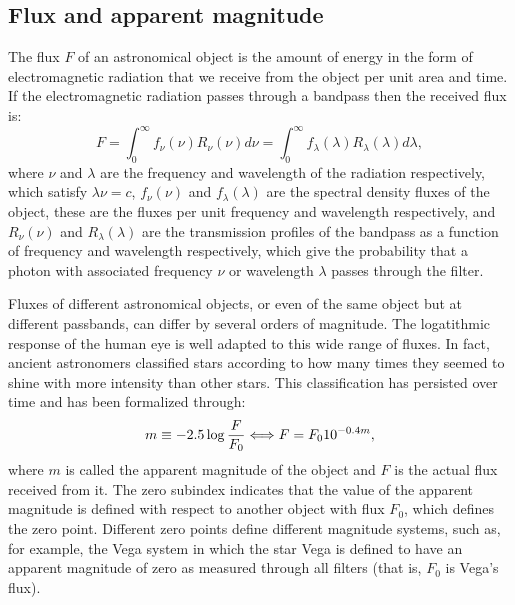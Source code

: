 \subsection{Flux and apparent magnitude}
The flux $F$ of an astronomical object is the amount of energy in the form of electromagnetic radiation that we receive from the object per unit area and time. If the electromagnetic radiation passes through a bandpass then the received flux is:
\begin{equation}
F = \int^{\infty}_0 f_\nu(\nu)R_\nu(\nu)d\nu = \int^{\infty}_0 f_\lambda(\lambda)R_\lambda(\lambda)d\lambda,
\label{eq:flux}
\end{equation}
where $\nu$ and $\lambda$ are the frequency and wavelength of the radiation respectively, which satisfy $\lambda \nu = c$, $f_\nu(\nu)$ and $f_\lambda(\lambda)$ are the spectral density fluxes of the object, these are the fluxes per unit frequency and wavelength respectively, and $R_\nu(\nu)$ and $R_\lambda(\lambda)$ are the transmission profiles of the bandpass as a function of frequency and wavelength respectively, which give the probability that a photon with associated frequency $\nu$ or wavelength $\lambda$ passes through the filter.

Fluxes of different astronomical objects, or even of the same object but at different passbands, can differ by several orders of magnitude. The logatithmic response of the human eye is well adapted to this wide range of fluxes. In fact, ancient astronomers classified stars according to how many times they seemed to shine with more intensity than other stars. This classification has persisted over time and has been formalized through: 
\begin{equation}
m \equiv -2.5\log{F \over F_0} \Longleftrightarrow F = F_0 10^{-0.4m},
\label{eq:mag}
\end{equation}
where $m$ is called the apparent magnitude of the object and $F$ is the actual flux received from it. The zero subindex indicates that the value of the apparent magnitude is defined with respect to another object with flux $F_0$, which defines the zero point. Different zero points define different magnitude systems, such as, for example, the Vega system in which the star Vega is defined to have an apparent magnitude of zero as measured through all filters (that is, $F_0$ is Vega's flux).

